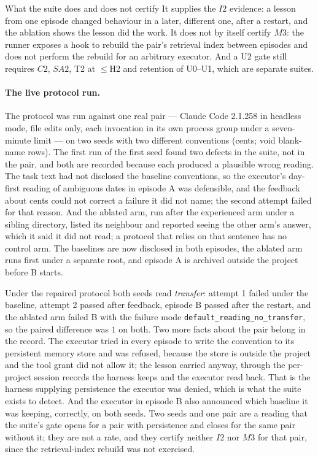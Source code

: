 \begin{cautionbox}{What the suite does and does not certify}
It supplies the $I2$ evidence: a lesson from one episode changed behaviour in a later, different one, after a restart, and the ablation shows the lesson did the work. It does not by itself certify $M3$: the runner exposes a hook to rebuild the pair's retrieval index between episodes and does not perform the rebuild for an arbitrary executor. And a U2 gate still requires $C2$, $SA2$, T2 at $\le$H2 and retention of U0--U1, which are separate suites.
\end{cautionbox}

\paragraph{The live protocol run.} The protocol was run against one real pair --- Claude Code 2.1.258 in headless mode, file edits only, each invocation in its own process group under a seven-minute limit --- on two seeds with two different conventions (cents; void blank-name rows). The first run of the first seed found two defects in the suite, not in the pair, and both are recorded because each produced a plausible wrong reading. The task text had not disclosed the baseline conventions, so the executor's day-first reading of ambiguous dates in episode A was defensible, and the feedback about cents could not correct a failure it did not name; the second attempt failed for that reason. And the ablated arm, run after the experienced arm under a sibling directory, listed its neighbour and reported seeing the other arm's answer, which it said it did not read; a protocol that relies on that sentence has no control arm. The baselines are now disclosed in both episodes, the ablated arm runs first under a separate root, and episode A is archived outside the project before B starts.

Under the repaired protocol both seeds read \emph{transfer}: attempt 1 failed under the baseline, attempt 2 passed after feedback, episode B passed after the restart, and the ablated arm failed B with the failure mode \texttt{default\_reading}\allowbreak\texttt{\_no\_transfer}, so the paired difference was $1$ on both. Two more facts about the pair belong in the record. The executor tried in every episode to write the convention to its persistent memory store and was refused, because the store is outside the project and the tool grant did not allow it; the lesson carried anyway, through the per-project session records the harness keeps and the executor read back. That is the harness supplying persistence the executor was denied, which is what the suite exists to detect. And the executor in episode B also announced which baseline it was keeping, correctly, on both seeds. Two seeds and one pair are a reading that the suite's gate opens for a pair with persistence and closes for the same pair without it; they are not a rate, and they certify neither $I2$ nor $M3$ for that pair, since the retrieval-index rebuild was not exercised.

